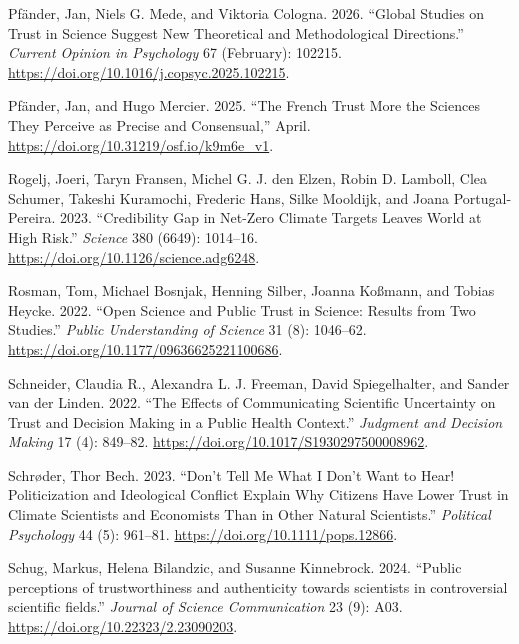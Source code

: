 \documentclass[
  letterpaper,
  DIV=11,
  numbers=noendperiod]{scrartcl}
\newlength{\cslhangindent}
\newenvironment{CSLReferences}[2] %
 {\begin{list}{}{%
  \setlength{\itemindent}{0pt}
  \setlength{\leftmargin}{0pt}
  \setlength{\parsep}{0pt}
  \ifodd #1
   \setlength{\leftmargin}{\cslhangindent}
   \setlength{\itemindent}{-1\cslhangindent}
  \fi
  \setlength{\itemsep}{#2\baselineskip}}}
 {\end{list}}
\begin{document}
\begin{CSLReferences}{1}{0}
Pfänder, Jan, Niels G. Mede, and Viktoria Cologna. 2026. {``Global
Studies on Trust in Science Suggest New Theoretical and Methodological
Directions.''} \emph{Current Opinion in Psychology} 67 (February):
102215. \url{https://doi.org/10.1016/j.copsyc.2025.102215}.

Pfänder, Jan, and Hugo Mercier. 2025. {``The French Trust More the
Sciences They Perceive as Precise and Consensual,''} April.
\url{https://doi.org/10.31219/osf.io/k9m6e_v1}.

Rogelj, Joeri, Taryn Fransen, Michel G. J. den Elzen, Robin D. Lamboll,
Clea Schumer, Takeshi Kuramochi, Frederic Hans, Silke Mooldijk, and
Joana Portugal-Pereira. 2023. {``Credibility Gap in Net-Zero Climate
Targets Leaves World at High Risk.''} \emph{Science} 380 (6649):
1014--16. \url{https://doi.org/10.1126/science.adg6248}.

Rosman, Tom, Michael Bosnjak, Henning Silber, Joanna Koßmann, and Tobias
Heycke. 2022. {``Open Science and Public Trust in Science: Results from
Two Studies.''} \emph{Public Understanding of Science} 31 (8): 1046--62.
\url{https://doi.org/10.1177/09636625221100686}.

Schneider, Claudia R., Alexandra L. J. Freeman, David Spiegelhalter, and
Sander van der Linden. 2022. {``The Effects of Communicating Scientific
Uncertainty on Trust and Decision Making in a Public Health Context.''}
\emph{Judgment and Decision Making} 17 (4): 849--82.
\url{https://doi.org/10.1017/S1930297500008962}.

Schrøder, Thor Bech. 2023. {``Don't Tell Me What I Don't Want to Hear!
Politicization and Ideological Conflict Explain Why Citizens Have Lower
Trust in Climate Scientists and Economists Than in Other Natural
Scientists.''} \emph{Political Psychology} 44 (5): 961--81.
\url{https://doi.org/10.1111/pops.12866}.

Schug, Markus, Helena Bilandzic, and Susanne Kinnebrock. 2024. {``Public
perceptions of trustworthiness and authenticity towards scientists in
controversial scientific fields.''} \emph{Journal of Science
Communication} 23 (9): A03. \url{https://doi.org/10.22323/2.23090203}.


\end{CSLReferences}
\end{document}
